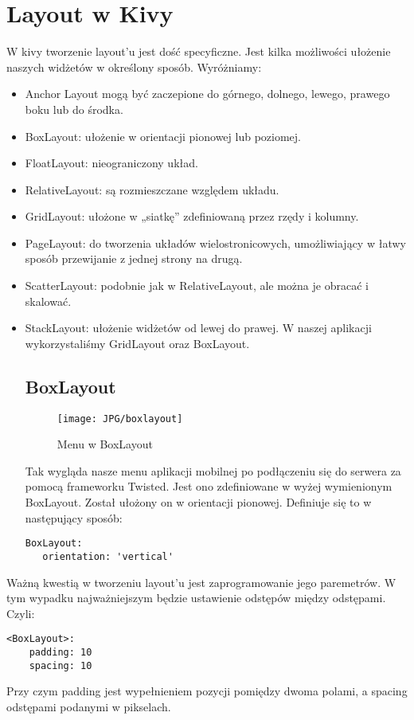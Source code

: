 \documentclass{xmgr}
\begin{document}
\section{Layout w Kivy}
W kivy tworzenie layout'u jest dość specyficzne. Jest kilka możliwości ułożenie naszych widżetów w określony sposób. Wyróżniamy:
\begin{itemize}
\item Anchor Layout mogą być zaczepione do górnego, dolnego, lewego, prawego boku lub do środka.
\item BoxLayout: ułożenie w orientacji pionowej lub poziomej.
\item FloatLayout: nieograniczony układ.
\item RelativeLayout: są rozmieszczane względem układu.
\item GridLayout: ułożone w „siatkę” zdefiniowaną przez rzędy i kolumny.
\item PageLayout: do tworzenia układów wielostronicowych, umożliwiający w łatwy sposób przewijanie z jednej strony na drugą.
\item ScatterLayout: podobnie jak w RelativeLayout, ale można je obracać i skalować.
\item StackLayout: ułożenie widżetów od lewej do prawej.
W naszej aplikacji wykorzystaliśmy GridLayout oraz BoxLayout.
\subsection{BoxLayout}
\begin{figure}
\begin{center}
\texttt{[image: JPG/boxlayout]}
\caption{Menu w BoxLayout}

\end{center}
\end{figure}

Tak wygląda nasze menu aplikacji mobilnej po podłączeniu się do serwera za pomocą frameworku Twisted. Jest ono zdefiniowane w wyżej wymienionym BoxLayout. Został ułożony on w orientacji pionowej. \newline Definiuje się to w następujący sposób:
\begin{lstlisting} 
BoxLayout:
   orientation: 'vertical'
\end{lstlisting}
\end{itemize}
Ważną kwestią w tworzeniu layout'u jest zaprogramowanie jego paremetrów. W tym wypadku najważniejszym będzie ustawienie odstępów między odstępami. Czyli:
\begin{lstlisting} 
<BoxLayout>:
	padding: 10
	spacing: 10
\end{lstlisting}
Przy czym padding jest wypełnieniem pozycji pomiędzy dwoma polami, a spacing odstępami podanymi w pikselach.
\newpage
\end{document}
